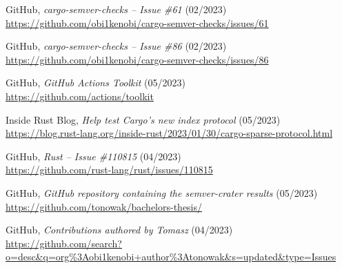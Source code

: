 \documentclass[licencjacka,en]{pracamgr}
\begin{document}
\begin{thebibliography}{99}

 GitHub,
	\textit{cargo-semver-checks -- Issue \#61} (02/2023) \\
	\url{https://github.com/obi1kenobi/cargo-semver-checks/issues/61}

 GitHub,
	\textit{cargo-semver-checks -- Issue \#86} (02/2023) \\
	\url{https://github.com/obi1kenobi/cargo-semver-checks/issues/86}










 GitHub,
	\textit{GitHub Actions Toolkit} (05/2023) \\
	\url{https://github.com/actions/toolkit}

 Inside Rust Blog,
\textit{Help test Cargo's new index protocol} (05/2023) \\
	\url{https://blog.rust-lang.org/inside-rust/2023/01/30/cargo-sparse-protocol.html}



 GitHub,
	\textit{Rust -- Issue \#110815} (04/2023) \\
	\url{https://github.com/rust-lang/rust/issues/110815}



 GitHub,
	\textit{GitHub repository containing the semver-crater results} (05/2023) \\
	\url{https://github.com/tonowak/bachelors-thesis/}



 GitHub,
	\textit{Contributions authored by Tomasz} (04/2023) \\
	\url{https://github.com/search?o=desc&q=org%3Aobi1kenobi+author%3Atonowak&s=updated&type=Issues}


\end{thebibliography}
\end{document}
